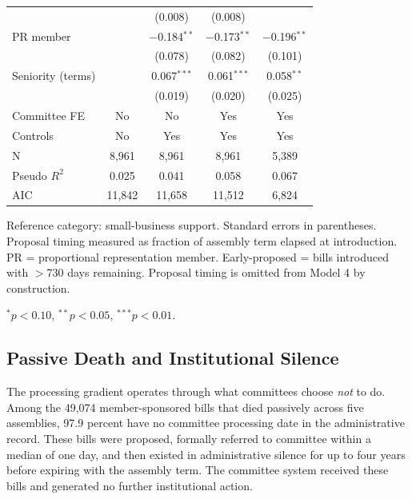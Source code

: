 \documentclass[11pt]{article}
\begin{document}
\begin{table}[htbp]
\begin{threeparttable}
\begin{tabular}{lcccc}
                         &         & (0.008) & (0.008) & \\[3pt]
PR member                &         & $-$0.184$^{**}$ & $-$0.173$^{**}$ & $-$0.196$^{**}$ \\
                         &         & (0.078) & (0.082) & (0.101) \\[3pt]
Seniority (terms)        &         & 0.067$^{***}$ & 0.061$^{***}$ & 0.058$^{**}$ \\
                         &         & (0.019) & (0.020) & (0.025) \\
\midrule
Committee FE             & No  & No  & Yes & Yes \\
Controls                 & No  & Yes & Yes & Yes \\
N                        & 8,961 & 8,961 & 8,961 & 5,389 \\
Pseudo $R^2$             & 0.025 & 0.041 & 0.058 & 0.067 \\
AIC                      & 11,842 & 11,658 & 11,512 & 6,824 \\
\bottomrule
\end{tabular}
\begin{tablenotes}
\footnotesize
\item Reference category: small-business support. Standard errors in parentheses. Proposal timing measured as fraction of assembly term elapsed at introduction. PR = proportional representation member. Early-proposed = bills introduced with $>$730 days remaining. Proposal timing is omitted from Model 4 by construction.
\item $^{*}p < 0.10$, $^{**}p < 0.05$, $^{***}p < 0.01$.
\end{tablenotes}
\end{threeparttable}
\end{table}

\subsection{Passive Death and Institutional Silence}

The processing gradient operates through what committees choose \textit{not} to do. Among the 49,074 member-sponsored bills that died passively across five assemblies, 97.9 percent have no committee processing date in the administrative record. These bills were proposed, formally referred to committee within a median of one day, and then existed in administrative silence for up to four years before expiring with the assembly term. The committee system received these bills and generated no further institutional action.
\end{document}

